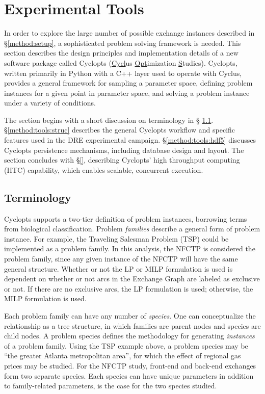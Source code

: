 
\section{Experimental Tools}\label{method:tools}

In order to explore the large number of possible exchange instances described in
\S \ref{method:setup}, a sophisticated problem solving framework is needed. This
section describes the design principles and implementation details of a new
software package called Cyclopts (\underline{Cycl}us \underline{Opt}imization
\underline{S}tudies). Cyclopts, written primarily in Python with a C++ layer
used to operate with Cyclus, provides a general framework for sampling a
parameter space, defining problem instances for a given point in parameter
space, and solving a problem instance under a variety of conditions.

The section begins with a short discussion on terminology in \S
\ref{method:tools:term}.  \S \ref{method:tools:struc} describes the general
Cyclopts workflow and specific features used in the DRE experimental
campaign. \S \ref{method:tools:hdf5} discusses Cyclopts persistence mechanisms,
including database design and layout. The section concludes with \S \ref{},
describing Cyclopts' high throughput computing (HTC) capability, which enables
scalable, concurrent execution.

\subsection{Terminology}\label{method:tools:term}

Cyclopts supports a two-tier definition of problem instances, borrowing terms
from biological classification. Problem \textit{families} describe a general
form of problem instance. For example, the Traveling Salesman Problem (TSP)
could be implemented as a problem family. In this analysis, the NFCTP is
considered the problem family, since any given instance of the NFCTP will have
the same general structure. Whether or not the LP or MILP formulation is used is
dependent on whether or not arcs in the Exchange Graph are labeled as exclusive
or not. If there are no exclusive arcs, the LP formulation is used; otherwise,
the MILP formulation is used.

Each problem family can have any number of \textit{species}. One can
conceptualize the relationship as a tree structure, in which families are parent
nodes and species are child nodes. A problem species defines the methodology for
generating \textit{instances} of a problem family. Using the TSP example above,
a problem species may be ``the greater Atlanta metropolitan area'', for which
the effect of regional gas prices may be studied. For the NFCTP study, front-end
and back-end exchanges form two separate species. Each species can have unique
parameters in addition to family-related parameters, is the case for the two
species studied.

